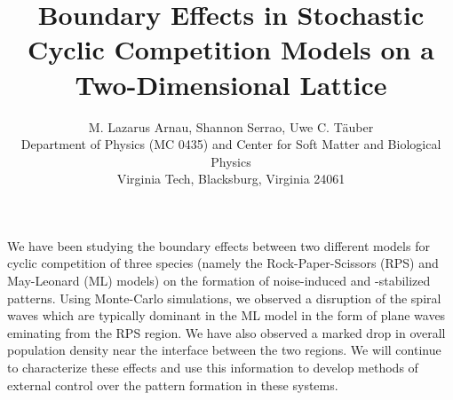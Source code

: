 \documentclass{article}
\title{Boundary Effects in Stochastic Cyclic Competition Models on a Two-Dimensional Lattice}
\author{M. Lazarus Arnau, Shannon Serrao, Uwe C. T{\"a}uber\\ Department of Physics (MC 0435) and Center for Soft Matter and Biological Physics\\ Virginia Tech, Blacksburg, Virginia 24061}
\begin{document}
We have been studying the boundary effects between two different models for cyclic
competition of three species (namely the Rock-Paper-Scissors (RPS) and May-Leonard
(ML) models) on the formation of noise-induced and -stabilized patterns. Using 
Monte-Carlo simulations, we observed a disruption of the spiral waves which are 
typically dominant in the ML model in the form of plane waves eminating from the 
RPS region. We have also observed a marked drop in overall population density 
near the interface between the two regions. We will continue to characterize these
effects and use this information to develop methods of external control over the 
pattern formation in these systems.
\end{document}
